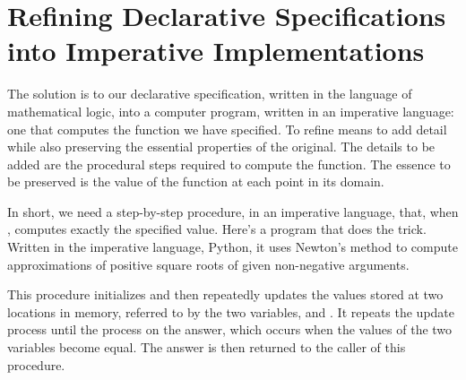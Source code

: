 \documentclass[letterpaper,10pt,english]{sphinxmanual}
\begin{document}
\section{Refining Declarative Specifications into Imperative Implementations}
\label{\detokenize{02-logic-and-code:refining-declarative-specifications-into-imperative-implementations}}
The solution is to  our declarative specification, written in
the language of mathematical logic, into a computer program, written
in an imperative language: one that computes  the function we
have specified. To refine means to add detail while also preserving
the essential properties of the original. The details to be added are
the procedural steps required to compute the function. The essence to
be preserved is the value of the function at each point in its domain.

In short, we need a step-by-step procedure, in an imperative language,
that, when , computes
exactly the specified value. Here’s a program that  does the
trick. Written in the imperative language, Python, it uses Newton’s
method to compute  approximations of positive square
roots of given non-negative  arguments.

\begin{sphinxVerbatim}[commandchars=\\\{\}]
 
      
     
          
           
          
     
\end{sphinxVerbatim}

This procedure initializes and then repeatedly updates the values
stored at two locations in memory, referred to by the two variables,
 and . It repeats the update process until the
process  on the answer, which occurs when the values of the
two variables become equal. The answer is then returned to the caller
of this procedure.
\end{document}
